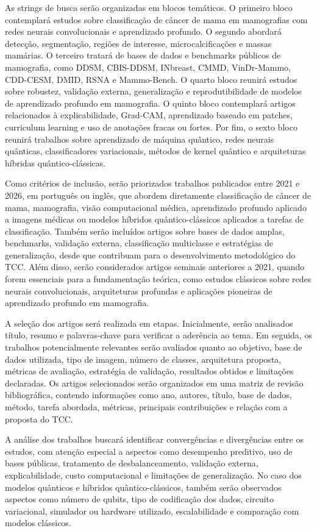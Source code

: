 \documentclass[
    12pt,
    openright,
    oneside,
    a4paper,
    english,
    brazil
]{abntex2}
\begin{document}
As strings de busca serão organizadas em blocos temáticos. O primeiro bloco contemplará estudos sobre classificação de câncer de mama em mamografias com redes neurais convolucionais e aprendizado profundo. O segundo abordará detecção, segmentação, regiões de interesse, microcalcificações e massas mamárias. O terceiro tratará de bases de dados e benchmarks públicos de mamografia, como DDSM, CBIS-DDSM, INbreast, CMMD, VinDr-Mammo, CDD-CESM, DMID, RSNA e Mammo-Bench. O quarto bloco reunirá estudos sobre robustez, validação externa, generalização e reprodutibilidade de modelos de aprendizado profundo em mamografia. O quinto bloco contemplará artigos relacionados à explicabilidade, Grad-CAM, aprendizado baseado em patches, curriculum learning e uso de anotações fracas ou fortes. Por fim, o sexto bloco reunirá trabalhos sobre aprendizado de máquina quântico, redes neurais quânticas, classificadores variacionais, métodos de kernel quântico e arquiteturas híbridas quântico-clássicas.

Como critérios de inclusão, serão priorizados trabalhos publicados entre 2021 e 2026, em português ou inglês, que abordem diretamente classificação de câncer de mama, mamografia, visão computacional médica, aprendizado profundo aplicado a imagens médicas ou modelos híbridos quântico-clássicos aplicados a tarefas de classificação. Também serão incluídos artigos sobre bases de dados amplas, benchmarks, validação externa, classificação multiclasse e estratégias de generalização, desde que contribuam para o desenvolvimento metodológico do TCC. Além disso, serão considerados artigos seminais anteriores a 2021, quando forem essenciais para a fundamentação teórica, como estudos clássicos sobre redes neurais convolucionais, arquiteturas profundas e aplicações pioneiras de aprendizado profundo em mamografia.

A seleção dos artigos será realizada em etapas. Inicialmente, serão analisados título, resumo e palavras-chave para verificar a aderência ao tema. Em seguida, os trabalhos potencialmente relevantes serão avaliados quanto ao objetivo, base de dados utilizada, tipo de imagem, número de classes, arquitetura proposta, métricas de avaliação, estratégia de validação, resultados obtidos e limitações declaradas. Os artigos selecionados serão organizados em uma matriz de revisão bibliográfica, contendo informações como ano, autores, título, base de dados, método, tarefa abordada, métricas, principais contribuições e relação com a proposta do TCC.

A análise dos trabalhos buscará identificar convergências e divergências entre os estudos, com atenção especial a aspectos como desempenho preditivo, uso de bases públicas, tratamento de desbalanceamento, validação externa, explicabilidade, custo computacional e limitações de generalização. No caso dos modelos quânticos e híbridos quântico-clássicos, também serão observados aspectos como número de qubits, tipo de codificação dos dados, circuito variacional, simulador ou hardware utilizado, escalabilidade e comparação com modelos clássicos.
\end{document}
